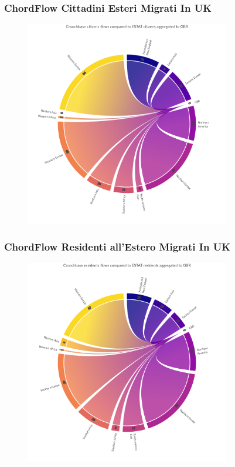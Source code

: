 \subsubsection{ChordFlow Cittadini Esteri Migrati In UK}
\begin{figure}[H]
    \centering
    \includegraphics[width=0.8\textwidth]{images/ChordFlows/filtered_destination/gbr/Crunchbase_cit_ESTAT_True.png}
    
    \label{fig:chordtogbr_cit_true}
\end{figure}
\subsubsection{ChordFlow Residenti all'Estero Migrati In UK}
\begin{figure}[H]
    \centering
    \includegraphics[width=0.8\textwidth]{images/ChordFlows/filtered_destination/gbr/Crunchbase_res_ESTAT_True.png}
    
    \label{fig:chordtogbr_res_true}
\end{figure}